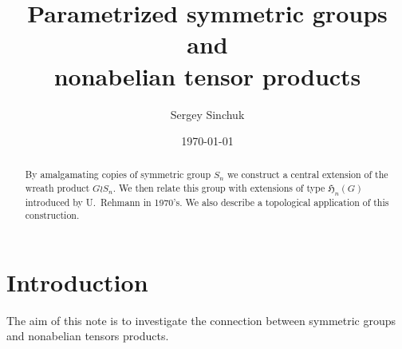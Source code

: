 \documentclass[oneside, 10pt]{amsart}
\title[Parametrized symmetric groups]{Parametrized symmetric groups and \\ nonabelian tensor products}
\author {Sergey Sinchuk}
\date {\today}
\theoremstyle{plain}
\numberwithin{equation}{section}
\numberwithin{lemma}{section}
\theoremstyle{remark}
\theoremstyle{definition}
\begin{document}
\begin{abstract} By amalgamating copies of symmetric group $S_n$ we construct a central extension of the wreath product $G \wr S_n$.
We then relate this group with extensions of type $\mathfrak{H}_n(G)$ introduced by U.~Rehmann in 1970's. 
We also describe a topological application of this construction.
\end{abstract}

\maketitle

\section{Introduction}
The aim of this note is to investigate the connection between symmetric groups and nonabelian tensors products.
\end{document}
